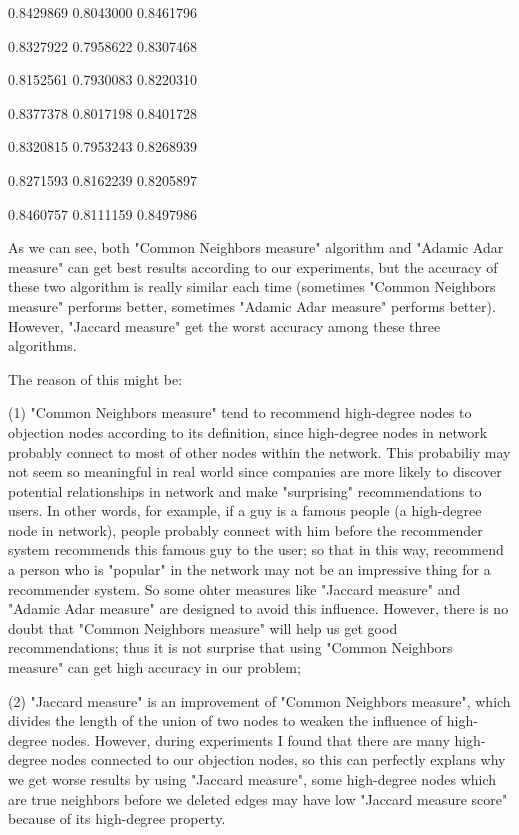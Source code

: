 \documentclass[11pt]{article}
\begin{document}
0.8429869 0.8043000 0.8461796

0.8327922 0.7958622 0.8307468

0.8152561 0.7930083 0.8220310

0.8377378 0.8017198 0.8401728

0.8320815 0.7953243 0.8268939

0.8271593 0.8162239 0.8205897

0.8460757 0.8111159 0.8497986

As we can see, both "Common Neighbors measure" algorithm and "Adamic Adar measure" can get best results according to our experiments, but the accuracy of these two algorithm is really similar each time (sometimes "Common Neighbors measure" performs better, sometimes "Adamic Adar measure" performs better). However, "Jaccard measure" get the worst accuracy among these three algorithms. 

The reason of this might be:

(1) "Common Neighbors measure" tend to recommend high-degree nodes to objection nodes according to its definition, since high-degree nodes in network probably connect to most of other nodes within the network. This probabiliy may not seem so meaningful in real world since companies are more likely to discover potential relationships in network and make "surprising" recommendations to users. In other words, for example, if a guy is a famous people (a high-degree node in network), people probably connect with him before the recommender system recommends this famous guy to the user; so that in this way, recommend a person who is "popular" in the network may not be an impressive thing for a recommender system. So some ohter measures like "Jaccard measure" and "Adamic Adar measure" are designed to avoid this influence. However, there is no doubt that "Common Neighbors measure" will help us get good recommendations; thus it is not surprise that using "Common Neighbors measure" can get high accuracy in our problem;

(2) "Jaccard measure" is an improvement of "Common Neighbors measure", which divides the length of the union of two nodes to weaken the influence of high-degree nodes. However, during experiments I found that there are many high-degree nodes connected to our objection nodes, so this can perfectly explans why we get worse results by using "Jaccard measure", some high-degree nodes which are true neighbors before we deleted edges may have low "Jaccard measure score" because of its high-degree property.
\end{document}
